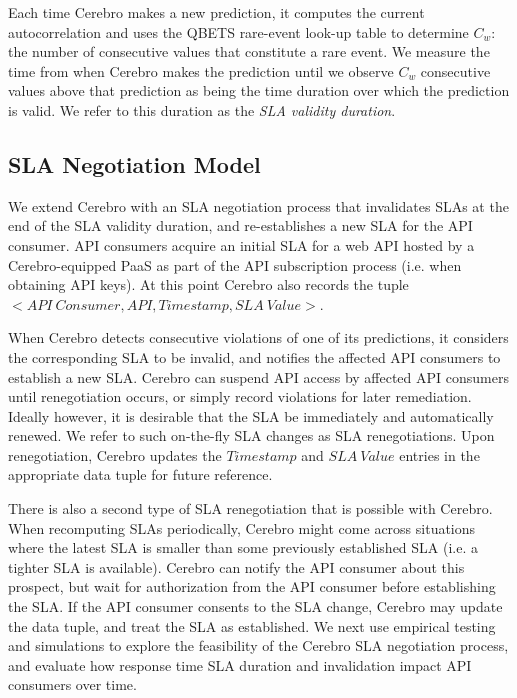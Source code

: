 Each time Cerebro makes a new prediction, it computes the current
autocorrelation and uses the QBETS rare-event look-up table to determine $C_{w}$:
the number of consecutive values that constitute a rare event.
We measure the time from when
Cerebro makes the prediction until we observe $C_{w}$ 
consecutive values above that prediction 
as being the time duration over which
the prediction is valid. 
We refer to this duration as the \textit{SLA validity duration}.  


\subsection{ SLA Negotiation Model}
We extend Cerebro with an SLA negotiation process that invalidates SLAs at the end of the
SLA validity duration, and re-establishes a new SLA for the API consumer.
API consumers acquire an initial SLA for a web API hosted by a Cerebro-equipped PaaS
as part of the API subscription process (i.e. when obtaining API keys).
At this point Cerebro also records the 
tuple $<API\ Consumer, API, Timestamp, SLA\ Value>$.

When Cerebro detects consecutive violations of one of its predictions,
it considers the corresponding SLA to be invalid, 
and notifies the affected API consumers to establish a 
new SLA. Cerebro can suspend API access by affected API consumers until 
renegotiation occurs, or simply record violations for later remediation.
Ideally however, it is desirable that the SLA be immediately and automatically 
renewed. We refer to such on-the-fly
SLA changes as SLA renegotiations. Upon renegotiation, 
Cerebro updates the $Timestamp$ and $SLA\ Value$ entries
in the appropriate data tuple for future reference.

There is also a second type of SLA renegotiation that is possible with Cerebro.
When recomputing SLAs periodically, Cerebro might come across situations where the latest SLA is smaller
than some previously established SLA (i.e. a tighter SLA is available). Cerebro can notify the 
API consumer about this prospect, but wait for authorization from the API consumer before 
establishing the SLA. If the API consumer consents to the SLA change, Cerebro may update the
data tuple, and treat the SLA as established.
We next use empirical testing and simulations to explore 
the feasibility of the Cerebro SLA negotiation process, and 
evaluate how response time SLA duration and invalidation impact API consumers over time.

